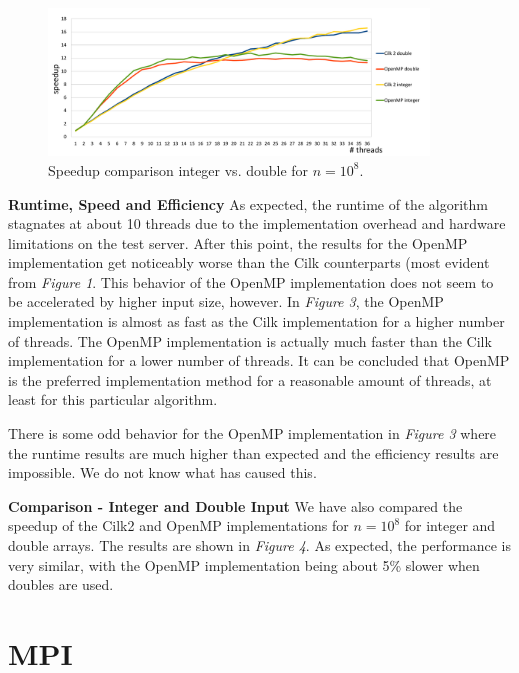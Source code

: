 \documentclass[12pt,a4paper]{article}
\begin{document}
\begin{figure}[h]
	\includegraphics[width=0.9\textwidth]{img/omp_cilk_double_comparison_100mil.pdf}
	\caption{Speedup comparison integer vs. double for  $n=10^{8}$.}
\end{figure}

\noindent\textbf{Runtime, Speed and Efficiency}\newline
As expected, the runtime of the algorithm stagnates at about 10 threads due to the implementation overhead and hardware limitations on the test server. After this point, the results for the OpenMP implementation get noticeably worse than the Cilk counterparts (most evident from \emph{Figure 1}. This behavior of the OpenMP implementation does not seem to be accelerated by higher input size, however. In \emph{Figure 3}, the OpenMP implementation is almost as fast as the Cilk implementation for a higher number of threads. The OpenMP implementation is actually much faster than the Cilk implementation for a lower number of threads. It can be concluded that OpenMP is the preferred implementation method for a reasonable amount of threads, at least for this particular algorithm.

There is some odd behavior for the OpenMP implementation in \emph{Figure 3} where the runtime results are much higher than expected and the efficiency results are impossible. We do not know what has caused this.\newline

\noindent\textbf{Comparison - Integer and Double Input}\newline
We have also compared the speedup of the Cilk2 and OpenMP implementations for $n=10^{8}$ for integer and double arrays. The results are shown in \emph{Figure 4}. As expected, the performance is very similar, with the OpenMP implementation being about 5\% slower when doubles are used.
\section{MPI}
\end{document}
